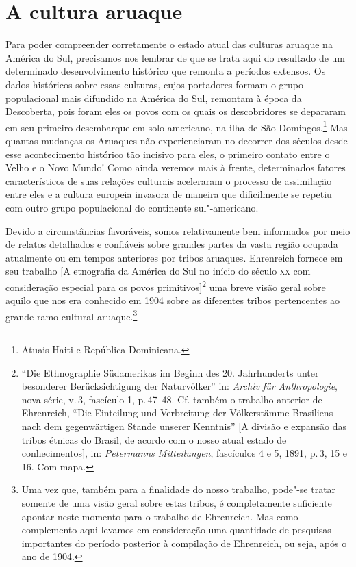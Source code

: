 
\chapter*{A cultura aruaque\smallskip{}}

Para poder compreender corretamente o estado atual das culturas aruaque
na América do Sul, precisamos nos lembrar de que se trata aqui do
resultado de um determinado desenvolvimento histórico que remonta a
períodos extensos. Os dados históricos sobre essas culturas, cujos
portadores formam o grupo populacional mais difundido na América do Sul,
remontam à época da Descoberta, pois foram eles os povos com os quais os
descobridores se depararam em seu primeiro desembarque em solo americano,
na ilha de São Domingos.\footnote{Atuais Haiti e República Dominicana.} Mas quantas mudanças os Aruaques não experienciaram no
decorrer dos séculos desde esse acontecimento histórico tão incisivo
para eles, o primeiro contato entre o Velho e o Novo Mundo! Como ainda veremos mais à frente,
determinados fatores característicos de suas relações culturais
aceleraram o processo de assimilação entre eles e a cultura europeia
invasora de maneira que dificilmente se repetiu com outro grupo
populacional do continente sul"-americano.

Devido a circunstâncias favoráveis, somos relativamente bem informados
por meio de relatos detalhados e confiáveis sobre grandes partes da
vasta região ocupada atualmente ou em tempos anteriores por tribos
aruaques. Ehrenreich fornece em seu trabalho {[}A etnografia da América do Sul no
início do século \textsc{xx} com consideração especial para os povos
primitivos{]}\footnote{``Die Ethnographie
Südamerikas im Beginn des 20. Jahrhunderts unter besonderer
Berücksichtigung der Naturvölker'' in: \textit{Archiv für Anthropologie}, nova série,
  v.\,3, fascículo 1, p.\,47--48. Cf. também o trabalho anterior de
  Ehrenreich, ``Die Einteilung und Verbreitung der Völkerstämme
  Brasiliens nach dem gegenwärtigen Stande unserer Kenntnis'' {[}A
  divisão e expansão das tribos étnicas do Brasil, de acordo com o nosso
  atual estado de conhecimentos{]}, in: \textit{Petermanns Mitteilungen},
  fascículos 4 e 5, 1891, p.\,3, 15 e 16. Com mapa.} uma breve visão
geral sobre aquilo que nos era conhecido em 1904 sobre as diferentes
tribos pertencentes ao grande ramo cultural aruaque.\footnote{Uma vez que, também
para a finalidade do nosso trabalho, pode"-se tratar somente de uma
visão geral sobre estas tribos, é completamente suficiente apontar neste
momento para o trabalho de Ehrenreich. Mas como complemento aqui
levamos em consideração uma quantidade de pesquisas importantes do
período posterior à compilação de Ehrenreich, ou seja, após o ano de
1904.}


